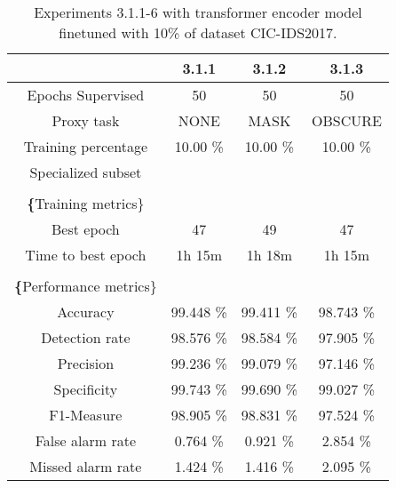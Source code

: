 \begin{table}[htb]
    \centering
    \begin{tabular}{@{}cccc@{}}
        \toprule
         & 3.1.1 & 3.1.2 & 3.1.3 \\
        \midrule
        Epochs Supervised &  50 &  50 &  50 \\
        Proxy task &  NONE &  MASK &  OBSCURE \\
        Training percentage &  10.00 \% &  10.00 \% &  10.00 \% \\
        Specialized subset &   &   &   \\
         \\
        \textbf\{Training metrics\} &  &  &  \\
        Best epoch &  47 &  49 &  47 \\
        Time to best epoch &  1h 15m &  1h 18m &  1h 15m \\
         \\
        \textbf\{Performance metrics\} &  &  &  \\
        Accuracy &  99.448 \% &  99.411 \% &  98.743 \% \\
        Detection rate &  98.576 \% &  98.584 \% &  97.905 \% \\
        Precision &  99.236 \% &  99.079 \% &  97.146 \% \\
        Specificity &  99.743 \% &  99.690 \% &  99.027 \% \\
        F1-Measure &  98.905 \% &  98.831 \% &  97.524 \% \\
        False alarm rate &  0.764 \% &  0.921 \% &  2.854 \% \\
        Missed alarm rate &  1.424 \% &  1.416 \% &  2.095 \% \\
        \bottomrule
    \end{tabular}
    \caption{Experiments 3.1.1-6 with transformer encoder model finetuned with 10\% of dataset CIC-IDS2017.}
    \label{table:results:lstm:stats_flows10}
\end{table}